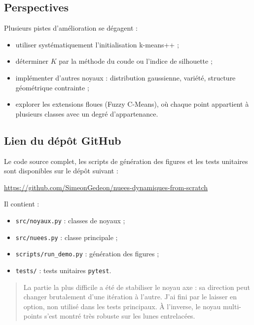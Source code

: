 \documentclass[a4paper, 11pt]{article}
\begin{document}
	\subsection{Perspectives}
	
	Plusieurs pistes d'amélioration se dégagent :
	\begin{itemize}
		\item utiliser systématiquement l'initialisation k-means++ ;
		\item déterminer \(K\) par la méthode du coude ou l'indice de
		silhouette ;
		\item implémenter d'autres noyaux : distribution gaussienne,
		variété, structure géométrique contrainte ;
		\item explorer les extensions floues (Fuzzy C-Means), où chaque
		point appartient à plusieurs classes avec un degré
		d'appartenance.
	\end{itemize}
	
	\subsection{Lien du dépôt GitHub}
	
	Le code source complet, les scripts de génération des figures et les
	tests unitaires sont disponibles sur le dépôt suivant :
	
	\begin{center}
		\url{https://github.com/SimeonGedeon/nuees-dynamiques-from-scratch}
	\end{center}
	
	\noindent Il contient :
	\begin{itemize}
		\item \texttt{src/noyaux.py} : classes de noyaux ;
		\item \texttt{src/nuees.py} : classe principale ;
		\item \texttt{scripts/run\_demo.py} : génération des figures ;
		\item \texttt{tests/} : tests unitaires \texttt{pytest}.
	\end{itemize}
	
	\begin{quote}
		La partie la plus difficile a été de
		stabiliser le noyau axe : sa direction peut changer brutalement
		d'une itération à l'autre. J'ai fini par le laisser en option, non
		utilisé dans les tests principaux. À l'inverse, le noyau multi-points
		s'est montré très robuste sur les lunes entrelacées.
	\end{quote}
	
\end{document}
